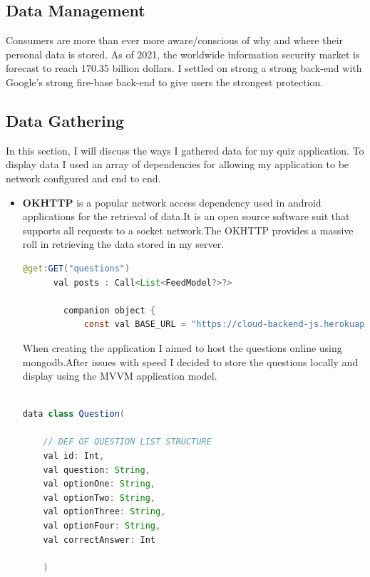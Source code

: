 \subsection{Data Management}
Consumers are more than ever more aware/conscious of why and where their personal data is stored. As of 2021, the worldwide information security market is forecast to reach 170.35 billion dollars. I settled on strong a strong back-end with Google's strong fire-base back-end to give users the strongest protection.

\subsection{Data Gathering}


In this section, I will discuss the ways I gathered data for my quiz application. To display data I used an array of dependencies for allowing my application to be network configured and end to end. 

\begin{itemize}
\item    \textbf{OKHTTP}
 is a popular network access dependency used in android applications for the retrieval of  data\cite{okhttp}.It is an open source software suit that supports all requests to a socket network.The OKHTTP provides a massive roll in retrieving the data stored in my server.


\begin{lstlisting}[language=Java, caption= OKHTTP GET REQUEST]
   @get:GET("questions")
      val posts : Call<List<FeedModel?>?>

        companion object {
            const val BASE_URL = "https://cloud-backend-js.herokuapp.com"    

\end{lstlisting}




When creating the application I aimed to host the questions online using mongodb.After issues with speed I decided to store the questions locally and display using the MVVM application model.

\begin{lstlisting}[language=Java, caption= Question Model]

data class Question(

    // DEF OF QUESTION LIST STRUCTURE
    val id: Int,
    val question: String,
    val optionOne: String,
    val optionTwo: String,
    val optionThree: String,
    val optionFour: String,
    val correctAnswer: Int

    )
    \end{lstlisting}



\end{itemize}


